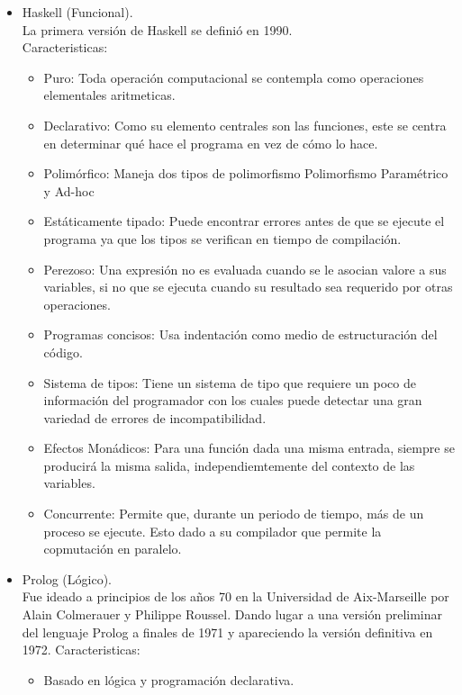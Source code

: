 \begin{itemize}
\begin{itemize}
	\end{itemize}
	\item Haskell (Funcional).\\
	La primera versión de Haskell se definió en 1990.\\
	Caracteristicas:
	\begin{itemize}
		\item Puro: Toda operación computacional se contempla como operaciones elementales aritmeticas.
		\item Declarativo: Como su elemento centrales son las funciones, este se centra en determinar qué hace el programa en vez de cómo lo hace.
		\item Polimórfico: Maneja dos tipos de polimorfismo Polimorfismo Paramétrico y Ad-hoc
		\item Estáticamente tipado: Puede encontrar errores antes de que se ejecute el programa ya que los tipos se verifican en tiempo de compilación.
		\item Perezoso: Una expresión no es evaluada cuando se le asocian valore a sus variables, si no que se ejecuta cuando su resultado sea requerido por otras operaciones.
		\item Programas concisos: Usa indentación como medio de estructuración del código.
		\item Sistema de tipos: Tiene un sistema de tipo que requiere un poco de información del programador con los cuales puede detectar una gran variedad de errores de incompatibilidad.
		\item Efectos Monádicos: Para una función dada una misma entrada, siempre se producirá la misma salida, independiemtemente del contexto de las variables.
		\item Concurrente: Permite que, durante un periodo de tiempo, más de un proceso se ejecute. Esto dado a su compilador que permite la copmutación en paralelo.
	\end{itemize}
	\item Prolog (Lógico).\\
	Fue ideado a principios de los años 70 en la Universidad de Aix-Marseille por Alain Colmerauer y Philippe Roussel. Dando lugar a una versión preliminar del lenguaje Prolog a finales de 1971 y apareciendo la versión definitiva en 1972.
	Caracteristicas:
	\begin{itemize}
		\item Basado en lógica y programación declarativa.

\end{itemize}
\end{itemize}
